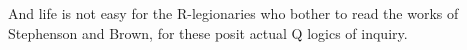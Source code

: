 And life is not easy for the R-legionaries who bother to read the works of Stephenson and Brown, for these posit actual Q logics of inquiry.